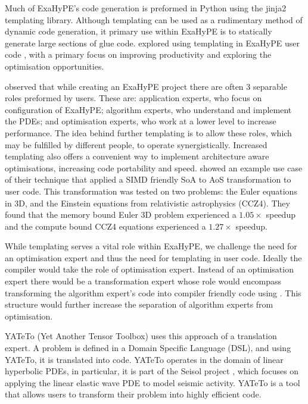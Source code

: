 

Much of ExaHyPE's code generation is preformed in Python using the jinja2 templating library.
Although templating can be used as a rudimentary method of dynamic code generation, it primary use within ExaHyPE is to statically generate large sections of glue code.
\citeauthor{templateExahype} explored using templating in ExaHyPE user code \cite{templateExahype}, with a primary focus on improving productivity and exploring the optimisation opportunities.

\citeauthor{templateExahype} observed that while creating an ExaHyPE project there are often 3 separable roles preformed by users.
These are: application experts, who focus on configuration of ExaHyPE; algorithm experts, who understand and implement the PDEs; and optimisation experts, who work at a lower level to increase performance.
The idea behind further templating is to allow these roles, which may be fulfilled by different people, to operate synergistically.
Increased templating also offers a convenient way to implement architecture aware optimisations, increasing code portability and speed.
\citeauthor{templateExahype} showed an example use case of their technique that applied a SIMD friendly SoA to AoS transformation to user code.
This transformation was tested on two problems: the Euler equations in 3D, and the Einstein equations from relativistic astrophysics (CCZ4).
They found that the memory bound Euler 3D problem experienced a $1.05\times$ speedup and the compute bound CCZ4 equations experienced a $1.27\times$ speedup.

While templating serves a vital role within ExaHyPE, we challenge the need for an optimisation expert and thus the need for templating in user code.
Ideally the compiler would take the role of optimisation expert.
Instead of an optimisation expert there would be a transformation expert whose role would encompass transforming the algorithm expert's code into compiler friendly code using \phlat.
This structure would further increase the separation of algorithm experts from optimisation.


YATeTo (Yet Another Tensor Toolbox) \cite{YATeTo} uses this approach of a translation expert.
A problem is defined in a Domain Specific Language (DSL), and using YATeTo, it is translated into code.
YATeTo operates in the domain of linear hyperbolic PDEs, in particular, it is part of the Seisol project \cite{seisolPFLOP}, which focuses on applying the linear elastic wave PDE to model seismic activity.
YATeTo is a tool that allows users to transform their problem into highly efficient code.   

